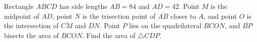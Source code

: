 Rectangle $ABCD$ has side lengths $AB=84$ and $AD=42$. Point $M$ is the midpoint of $\overline{AD}$,  point $N$ is the trisection point of $\overline{AB}$ closer to $A$,  and point $O$ is the intersection of $\overline{CM}$ and $\overline{DN}$. Point $P$ lies on the quadrilateral $BCON$,  and $\overline{BP}$ bisects the area of $BCON$. Find the area of $\triangle{CDP}$.